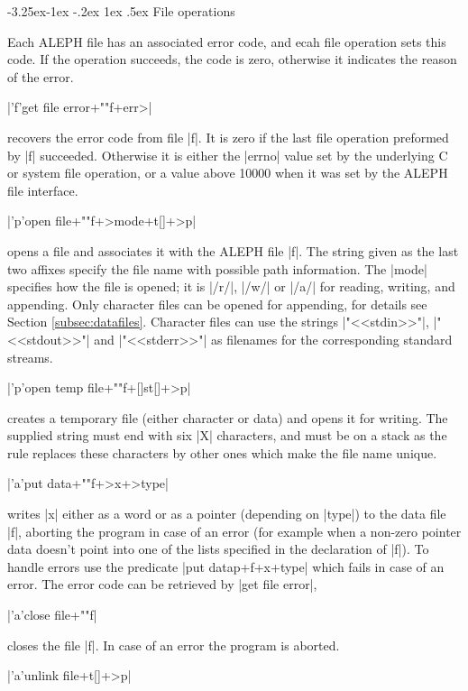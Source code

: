 \documentclass[titlepage]{article}
\makeatletter
\newcommand\A{\textsf{ALEPH}}
\newcommand\g[1]{\textsf{#1}}
\renewcommand\subsection{%
\@startsection{subsection}{2}{\z@}%
   {-3.25ex\@plus -1ex \@minus -.2ex}%
   {1ex \@plus .5ex}%
   {\normalfont\normalsize\bfseries}}
\makeatother
\begin{document}
\subsection{File operations}

Each \A{} file has an associated error code, and ecah file operation sets
this code. If the operation succeeds, the code is zero, otherwise it
indicates the reason of the error.

\pp|'f'get file error+""f+err>|

\noindent
recovers the error code from file \pp|f|. It is zero if the last file
operation preformed by \pp|f| succeeded. Otherwise it is either the
\pp|errno| value set by the underlying {\sf C} or system file operation, or
a value above 10000 when it was set by the \A{} file interface.

\pp|'p'open file+""f+>mode+t[]+>p|

\noindent
opens a file and associates it with the \A{} file \pp|f|. The string given
as the last two affixes specify the file name with possible path
information. The \pp|mode| specifies how the file is opened; it is \pp|/r/|,
\pp|/w/| or \pp|/a/| for reading, writing, and appending. Only character
files can be opened for appending, for details see Section
\ref{subsec:datafiles}. Character files can use the strings
\pp|"<<stdin>>"|, \pp|"<<stdout>>"| and \pp|"<<stderr>>"| as filenames for
the corresponding standard streams.

\pp|'p'open temp file+""f+[]st[]+>p| 

\noindent
creates a temporary file (either character or data) and opens it for
writing. The supplied string must end with six \pp|X| characters, and must
be on a \g{stack} as the rule replaces these characters by other ones
which make the file name unique.

\pp|'a'put data+""f+>x+>type| 

\noindent
writes \pp|x| either as a word or as a pointer (depending on \pp|type|) to
the data file \pp|f|, aborting the program in case of an error (for example
when a non-zero pointer data doesn't point into one of the lists specified
in the declaration of \pp|f|). To handle errors use the predicate \pp|put
datap+f+x+type| which fails in case of an error. The error code can be
retrieved by \pp|get file error|,

\pp|'a'close file+""f|

\noindent
closes the file \pp|f|. In case of an error the program is aborted. 

\pp|'a'unlink file+t[]+>p|
\end{document}
